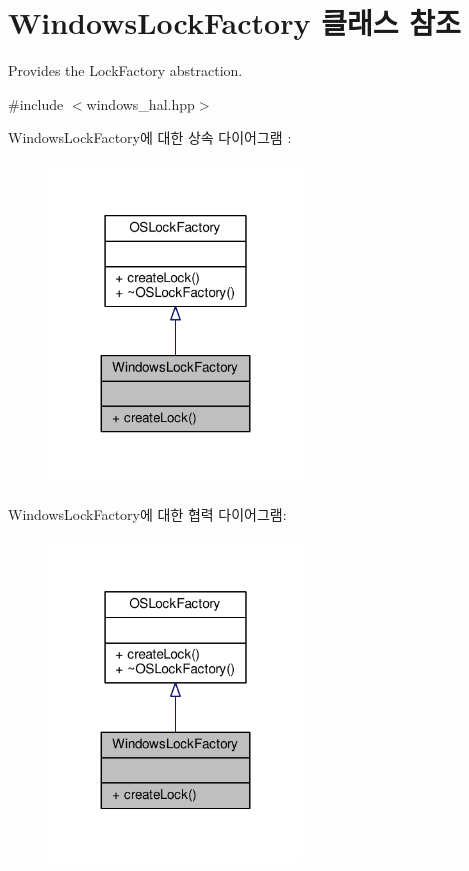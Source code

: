 \hypertarget{class_windows_lock_factory}{}\section{Windows\+Lock\+Factory 클래스 참조}
\label{class_windows_lock_factory}


Provides the Lock\+Factory abstraction.  




{\ttfamily \#include $<$windows\+\_\+hal.\+hpp$>$}



Windows\+Lock\+Factory에 대한 상속 다이어그램 \+: 
\nopagebreak
\begin{figure}[H]
\begin{center}
\leavevmode
\includegraphics[width=191pt]{class_windows_lock_factory__inherit__graph}
\end{center}
\end{figure}


Windows\+Lock\+Factory에 대한 협력 다이어그램\+:
\nopagebreak
\begin{figure}[H]
\begin{center}
\leavevmode
\includegraphics[width=191pt]{class_windows_lock_factory__coll__graph}
\end{center}
\end{figure}
